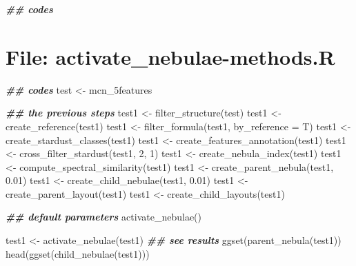 \documentclass[
]{article}
\newenvironment{Shaded}{\begin{snugshade}}{\end{snugshade}}
\newcommand{\AttributeTok}[1]{\textcolor[rgb]{0.77,0.63,0.00}{#1}}
\newcommand{\DecValTok}[1]{\textcolor[rgb]{0.00,0.00,0.81}{#1}}
\newcommand{\DocumentationTok}[1]{\textcolor[rgb]{0.56,0.35,0.01}{\textbf{\textit{#1}}}}
\newcommand{\FloatTok}[1]{\textcolor[rgb]{0.00,0.00,0.81}{#1}}
\newcommand{\FunctionTok}[1]{\textcolor[rgb]{0.00,0.00,0.00}{#1}}
\newcommand{\NormalTok}[1]{#1}
\newcommand{\OtherTok}[1]{\textcolor[rgb]{0.56,0.35,0.01}{#1}}
\begin{document}
\begin{Shaded}
\begin{Highlighting}[]
\DocumentationTok{\#\# codes}
\end{Highlighting}
\end{Shaded}

\hypertarget{file-activate_nebulae-methods.r}{%
\section{File: activate\_nebulae-methods.R}\label{file-activate_nebulae-methods.r}}

\begin{Shaded}
\begin{Highlighting}[]
\DocumentationTok{\#\# codes}
\NormalTok{test }\OtherTok{\textless{}{-}}\NormalTok{ mcn\_5features}

\DocumentationTok{\#\# the previous steps}
\NormalTok{test1 }\OtherTok{\textless{}{-}} \FunctionTok{filter\_structure}\NormalTok{(test)}
\NormalTok{test1 }\OtherTok{\textless{}{-}} \FunctionTok{create\_reference}\NormalTok{(test1)}
\NormalTok{test1 }\OtherTok{\textless{}{-}} \FunctionTok{filter\_formula}\NormalTok{(test1, }\AttributeTok{by\_reference =}\NormalTok{ T)}
\NormalTok{test1 }\OtherTok{\textless{}{-}} \FunctionTok{create\_stardust\_classes}\NormalTok{(test1)}
\NormalTok{test1 }\OtherTok{\textless{}{-}} \FunctionTok{create\_features\_annotation}\NormalTok{(test1)}
\NormalTok{test1 }\OtherTok{\textless{}{-}} \FunctionTok{cross\_filter\_stardust}\NormalTok{(test1, }\DecValTok{2}\NormalTok{, }\DecValTok{1}\NormalTok{)}
\NormalTok{test1 }\OtherTok{\textless{}{-}} \FunctionTok{create\_nebula\_index}\NormalTok{(test1)}
\NormalTok{test1 }\OtherTok{\textless{}{-}} \FunctionTok{compute\_spectral\_similarity}\NormalTok{(test1)}
\NormalTok{test1 }\OtherTok{\textless{}{-}} \FunctionTok{create\_parent\_nebula}\NormalTok{(test1, }\FloatTok{0.01}\NormalTok{)}
\NormalTok{test1 }\OtherTok{\textless{}{-}} \FunctionTok{create\_child\_nebulae}\NormalTok{(test1, }\FloatTok{0.01}\NormalTok{)}
\NormalTok{test1 }\OtherTok{\textless{}{-}} \FunctionTok{create\_parent\_layout}\NormalTok{(test1)}
\NormalTok{test1 }\OtherTok{\textless{}{-}} \FunctionTok{create\_child\_layouts}\NormalTok{(test1)}

\DocumentationTok{\#\# default parameters}
\FunctionTok{activate\_nebulae}\NormalTok{()}

\NormalTok{test1 }\OtherTok{\textless{}{-}} \FunctionTok{activate\_nebulae}\NormalTok{(test1)}
\DocumentationTok{\#\# see results}
\FunctionTok{ggset}\NormalTok{(}\FunctionTok{parent\_nebula}\NormalTok{(test1))}
\FunctionTok{head}\NormalTok{(}\FunctionTok{ggset}\NormalTok{(}\FunctionTok{child\_nebulae}\NormalTok{(test1)))}


\end{Highlighting}
\end{Shaded}
\end{document}
